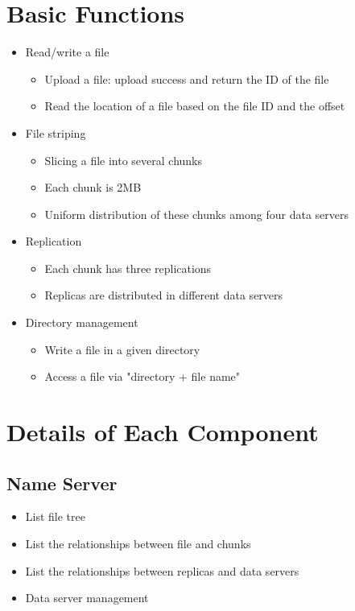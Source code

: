 \documentclass{article}
\begin{document}
\section{Basic Functions}
\begin{itemize}
    \item Read/write a file
        \begin{itemize}
            \item Upload a file: upload success and return the ID of the file
            \item Read the location of a file based on the file ID and the offset
        \end{itemize}
    \item File striping
        \begin{itemize}
            \item Slicing a file into several chunks
            \item Each chunk is 2MB
            \item Uniform distribution of these chunks among four data servers
        \end{itemize}
    \item Replication
        \begin{itemize}
            \item Each chunk has three replications
            \item Replicas are distributed in different data servers
        \end{itemize}
    \item Directory management
        \begin{itemize}
            \item Write a file in a given directory
            \item Access a file via "directory + file name"
        \end{itemize}    
\end{itemize}

\section{Details of Each Component}
\subsection{Name Server}
\begin{itemize}
    \item List file tree
    \item List the relationships between file and chunks
    \item List the relationships between replicas and data servers
    \item Data server management
\end{itemize}
\end{document}
